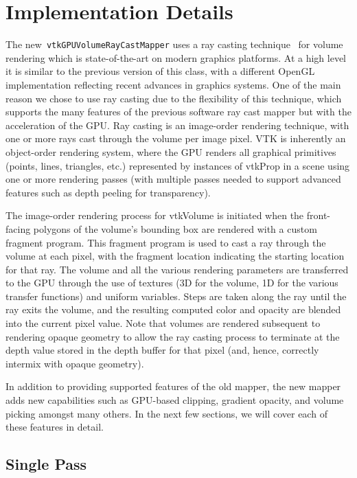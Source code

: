 \section{Implementation Details}
\label{implementationdetails}
The new~\texttt{vtkGPUVolumeRayCastMapper} uses a ray casting
technique~\citep{engel_real-time_2006} for volume rendering which is
state-of-the-art on modern graphics platforms. At a high level it is similar to
the previous version of this class, with a different OpenGL implementation
reflecting recent advances in graphics systems. One of the main reason we chose
to use ray casting due to the flexibility of this technique, which supports the
many features of the previous software ray cast mapper but with the acceleration
of the GPU. Ray casting is an image-order rendering technique, with one or more
rays cast through the volume per image pixel. VTK is inherently an object-order
rendering system, where the GPU renders all graphical primitives (points, lines,
triangles, etc.) represented by instances of vtkProp in a scene using one or
more rendering passes (with multiple passes needed to support advanced features
such as depth peeling for transparency).

The image-order rendering process for vtkVolume is initiated when the
front-facing polygons of the volume’s bounding box are rendered with a custom
fragment program. This fragment program is used to cast a ray through the volume
at each pixel, with the fragment location indicating the starting location for
that ray. The volume and all the various rendering parameters are transferred to
the GPU through the use of textures (3D for the volume, 1D for the various
transfer functions) and uniform variables. Steps are taken along the ray until
the ray exits the volume, and the resulting computed color and opacity are
blended into the current pixel value. Note that volumes are rendered subsequent
to rendering opaque geometry to allow the ray casting process to terminate at
the depth value stored in the depth buffer for that pixel (and, hence, correctly
intermix with opaque geometry).

In addition to providing supported features of the old mapper, the new mapper
adds new capabilities such as GPU-based clipping,  gradient opacity, and volume
picking amongst many others. In the next few sections, we will cover each of
these features in detail.

\subsection{Single Pass}


